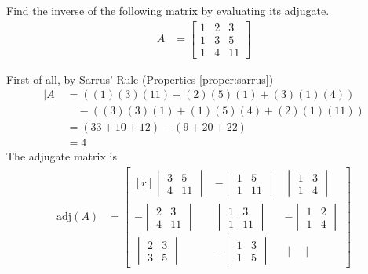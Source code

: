 \begin{exmp}
Find the inverse of the following matrix by evaluating its adjugate.
\begin{align*}
A &= 
\begin{bmatrix}
1 & 2 & 3 \\
1 & 3 & 5 \\
1 & 4 & 11
\end{bmatrix}
\end{align*}
\end{exmp}
\begin{solution}
First of all, by Sarrus' Rule (Properties \ref{proper:sarrus})
\begin{align*}
|A| &= ((1)(3)(11) + (2)(5)(1) + (3)(1)(4))\\
&\quad- ((3)(3)(1) + (1)(5)(4) + (2)(1)(11)) \\
&= (33 + 10 + 12) - (9 + 20 + 22) \\
&= 4
\end{align*}
The adjugate matrix is
\begin{align*}
\text{adj}(A) &=
\begin{bmatrix*}[r]
\begin{vmatrix}
3 & 5 \\
4 & 11
\end{vmatrix}
&
-\begin{vmatrix}
1 & 5 \\
1 & 11
\end{vmatrix}
&
\begin{vmatrix}
1 & 3 \\
1 & 4
\end{vmatrix}\\[10pt]
-\begin{vmatrix}
2 & 3 \\
4 & 11
\end{vmatrix}
&
\begin{vmatrix}
1 & 3 \\
1 & 11
\end{vmatrix}
&
-\begin{vmatrix}
1 & 2 \\
1 & 4
\end{vmatrix}\\[10pt]
\begin{vmatrix}
2 & 3 \\
3 & 5
\end{vmatrix}
&
-\begin{vmatrix}
1 & 3 \\
1 & 5
\end{vmatrix}
&
\begin{vmatrix}

\end{vmatrix}
\end{bmatrix*}
\end{align*}
\end{solution}
